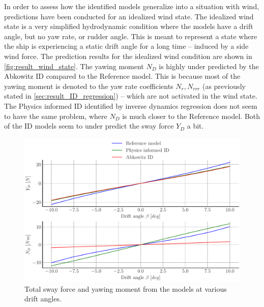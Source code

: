 In order to assess how the identified models generalize into a situation with wind, predictions have been conducted for an idealized wind state. The idealized wind state is a very simplified hydrodynamic condition where the models have a drift angle, but no yaw rate, or rudder angle. This is meant to represent a state where the ship is experiencing a static drift angle for a long time -- induced by a side wind force.
The prediction results for the idealized wind condition are shown in \autoref{fig:result_wind_state}. The yawing moment $N_D$ is highly under predicted by the Abkowitz ID compared to the Reference model. This is because most of the yawing moment is denoted to the yaw rate coefficients $N_r,N_{rrr}$ (as previously stated in \autoref{sec:result_ID_regression}) -- which are not activated in the wind state. The Physics informed ID identified by inverse dynamics regression does not seem to have the same problem, where $N_D$ is much closer to the Reference model. Both of the ID models seem to under predict the sway force $Y_D$ a bit.
\label{sec:wind_state}
\begin{figure}[h!]
    \includegraphics[width=\columnwidth]{figures/result_wind_state.forces.pdf}
    \caption{Total sway force and yawing moment from the models at various drift angles.}
    \label{fig:result_wind_state}
\end{figure}